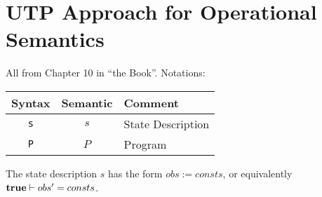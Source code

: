 \section{UTP Approach for Operational Semantics}

All from Chapter 10 in ``the Book''.
Notations:

\begin{tabular}{|c|c|l|}
\hline
  Syntax & Semantic & Comment
\\\hline
  \texttt{s} & $s$ & State Description
\\\hline
  \texttt{P} & $P$ & Program
\\\hline
\end{tabular}

The state description $s$ has the form $obs:=consts$,
or equivalently $\mathbf{true} \vdash obs'=consts$.


